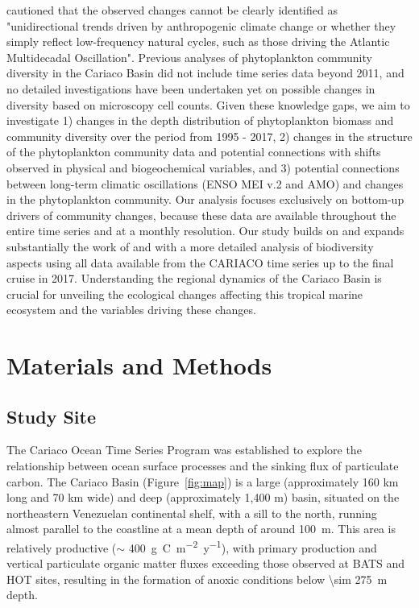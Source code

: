 \documentclass[draft]{agujournal2019}
\begin{document}
     cautioned that the observed changes cannot be clearly identified as "unidirectional trends driven by anthropogenic climate change or whether they simply reflect low-frequency natural cycles, such as those driving the Atlantic Multidecadal Oscillation".
    Previous analyses of phytoplankton community diversity in the Cariaco Basin did not include time series data beyond 2011, and no detailed investigations have been undertaken yet on possible changes in diversity based on microscopy cell counts.
    Given these knowledge gaps, we aim to investigate 1) changes in the depth distribution of phytoplankton biomass and community diversity over the period from 1995 - 2017, 2) changes in the structure of the phytoplankton community data and potential connections with shifts observed in physical and biogeochemical variables, and 3) potential connections between long-term climatic oscillations (ENSO MEI v.2 and AMO) and changes in the phytoplankton community.
    Our analysis focuses exclusively on bottom-up drivers of community changes, because these data are available throughout the entire time series and at a monthly resolution. Our study builds on and expands substantially the work of  and  with a more detailed analysis of biodiversity aspects using all data available from the CARIACO time series up to the final cruise in 2017. Understanding the regional dynamics of the Cariaco Basin is crucial for unveiling the ecological changes affecting this tropical marine ecosystem and the variables driving these changes. 
        
   


\section{Materials and Methods}
%
\subsection{Study Site}
    The Cariaco Ocean Time Series Program was established to explore the relationship between ocean surface processes and the sinking flux of particulate carbon. The Cariaco Basin (Figure~\ref{fig:map}) is a large (approximately 160 km long and 70 km wide) and deep (approximately 1,400 m) basin, situated on the northeastern Venezuelan continental shelf, with a sill to the north, running almost parallel to the coastline at a mean depth of around \qty{100}{m}. This area is relatively productive ($\sim$ \qty{400}{g.C.m^{-2}.y^{-1}}), with primary production and vertical particulate organic matter fluxes exceeding those observed at BATS and HOT sites, resulting in the formation of anoxic conditions below \qty{\sim 275}{m} depth.
\end{document}
